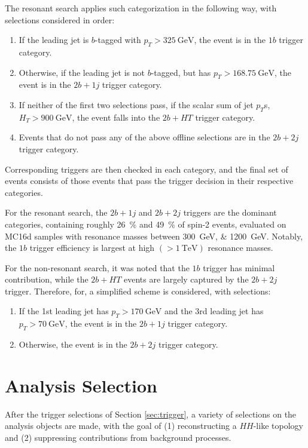 The resonant search applies such categorization in the following way, with 
selections considered in order:
\begin{enumerate}
	\item If the leading jet is $b$-tagged with $p_{T} > \SI{325}{\GeV}$, the event is in the $1b$ trigger category.
	\item Otherwise, if the leading jet is not $b$-tagged, but has $p_{T} > \SI{168.75}{\GeV}$, the event is in the $2b+1j$
	trigger category.
	\item If neither of the first two selections pass, if the scalar sum of jet $p_{T}$s, $H_{T} > \SI{900}{\GeV}$,
	the event falls into the $2b+HT$ trigger category.
	\item Events that do not pass any of the above offline selections are in the $2b+2j$ trigger category.
\end{enumerate}
Corresponding triggers are then checked in each category, and the final set of events consists of those events that 
pass the trigger decision in their respective categories. 

For the resonant search, the $2b+1j$ and $2b+2j$ triggers are the dominant categories, containing roughly 26~\% and
49~\% of spin-2 events, evaluated on MC16d samples with resonance masses between \SIlist{300;1200}{\GeV}. Notably, 
the $1b$ trigger efficiency is largest at high $(>\SI{1}{\TeV})$ resonance masses.

For the non-resonant search, it was noted that the $1b$ trigger has minimal contribution, while the $2b+HT$ events are 
largely captured by the $2b+2j$ trigger. Therefore, for, a simplified scheme is considered, 
with selections:
\begin{enumerate}
	\item If the 1st leading jet has $p_{T} > \SI{170}{\GeV}$ and the 3rd leading jet has $p_{T} > \SI{70}{\GeV}$,
	the event is in the $2b+1j$ trigger category.
	\item Otherwise, the event is in the $2b+2j$ trigger category.
\end{enumerate}


\section{Analysis Selection}
After the trigger selections of Section \ref{sec:trigger}, a variety of selections on the analysis objects
are made, with the goal of (1) reconstructing a $HH$-like topology and (2) suppressing contributions from 
background processes. 

